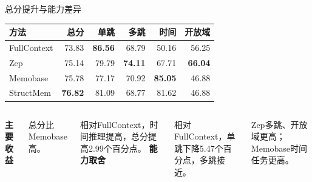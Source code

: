 \begin{frame}{总分提升与能力差异}
\vspace{2mm}
\small\renewcommand{\arraystretch}{1.25}
\begin{tabularx}{\linewidth}{@{}Yrrrrr@{}}
\toprule 方法 & 总分 & 单跳 & 多跳 & 时间 & 开放域\\\midrule
FullContext & 73.83 & \textbf{86.56} & 68.79 & 50.16 & 56.25\\
Zep & 75.14 & 79.79 & \textbf{74.11} & 67.71 & \textbf{66.04}\\
Memobase & 75.78 & 77.17 & 70.92 & \textbf{85.05} & 46.88\\
StructMem & \textbf{76.82} & 81.09 & 68.77 & 81.62 & 46.88\\\bottomrule
\end{tabularx}\par
\vspace{4mm}
\begin{columns}[T,onlytextwidth]
\textbf{主要收益}\par\vspace{2mm}
总分比Memobase高。\par\vspace{1mm}
相对FullContext，时间推理提高，总分提高2.99个百分点。
\textbf{能力取舍}\par\vspace{2mm}
相对FullContext，单跳下降5.47个百分点，多跳接近。\par\vspace{1mm}
Zep多跳、开放域更高；Memobase时间任务更高。
\end{columns}

\end{frame}

